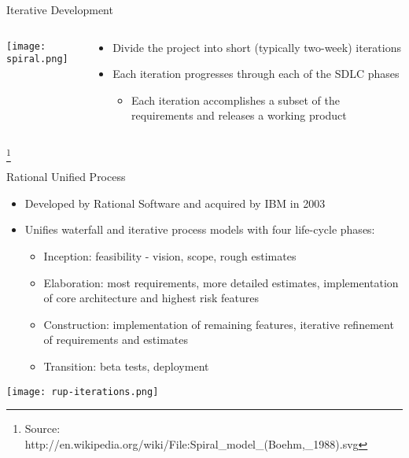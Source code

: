 \documentclass{beamer}
\begin{document}
\begin{frame}[fragile]{Iterative Development}

\begin{columns}[c]
\begin{column}{2.8in}
\begin{center}
\texttt{[image: spiral.png]}
\end{center}
\end{column}
\begin{column}{2in}
\begin{itemize}
\item Divide the project into short (typically two-week) iterations
\item Each iteration progresses through each of the SDLC phases
\begin{itemize}
\item Each iteration accomplishes a subset of the requirements and releases a working product
\end{itemize}
\end{itemize}
\end{column}
\end{columns}
\footnote{Source: http://en.wikipedia.org/wiki/File:Spiral\_model\_(Boehm,\_1988).svg}

\end{frame}

\begin{frame}[fragile]{Rational Unified Process}


\begin{itemize}
\item Developed by Rational Software and acquired by IBM in 2003
\item Unifies waterfall and iterative process models with four life-cycle phases:
\begin{itemize}
\item Inception: feasibility - vision, scope, rough estimates
\item Elaboration: most requirements, more detailed estimates, implementation of core architecture and highest risk features
\item Construction: implementation of remaining features, iterative refinement of requirements and estimates
\item Transition: beta tests, deployment
\end{itemize}
\end{itemize}
\begin{center}
\texttt{[image: rup-iterations.png]}
\end{center}


\end{frame}
\end{document}
